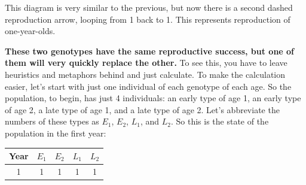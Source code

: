 \documentclass[10pt,reqno]{amsbook}
\numberwithin{equation}{chapter}
\newcommand{\noi}{\noindent}
\begin{document}
\noi This diagram is very similar to the previous, but now there is a second dashed reproduction arrow, looping from 1 back to 1. This represents reproduction of one-year-olds. 

\textbf{These two genotypes have the same reproductive success, but one of them will very quickly replace the other.} 
To see this, you have to leave heuristics and metaphors behind and just calculate. To make the calculation easier, let's start with just one individual of each genotype of each age. So the population, to begin, has just 4 individuals: an early type of age 1, an early type of age 2, a late type of age 1, and a late type of age 2. Let's abbreviate the numbers of these types as $E_1$, $E_2$, $L_1$, and $L_2$. So this is the state of the population in the first year:
\begin{center}
\begin{tabular}{ccccc}
Year & $E_1$ & $E_2$ & $L_1$ & $L_2$\\
\hline
1 & 1 & 1 & 1 & 1
\end{tabular}
\end{center}
\end{document}
